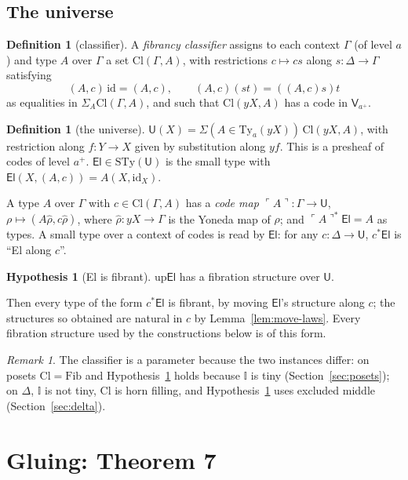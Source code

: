 \documentclass[11pt]{article}
\newcommand{\I}{\mathbb{I}}
\newcommand{\V}{\mathsf{V}}
\newcommand{\U}{\mathsf{U}}
\newcommand{\El}{\mathsf{El}}
\newcommand{\Fib}{\mathrm{Fib}}
\newcommand{\Ty}{\mathrm{Ty}}
\newcommand{\STy}{\mathrm{STy}}
\newcommand{\Cl}{\mathrm{Cl}}
\newcommand{\id}{\mathrm{id}}
\newcommand{\up}{\mathrm{up}}
\newcommand{\code}[1]{\ulcorner #1\urcorner}
\theoremstyle{plain}
\theoremstyle{definition}
\newtheorem{definition}[theorem]{Definition}
\newtheorem{hypothesis}[theorem]{Hypothesis}
\theoremstyle{remark}
\newtheorem{remark}[theorem]{Remark}
\begin{document}
\subsection{The universe}

\begin{definition}[classifier]
A \emph{fibrancy classifier} assigns to each context $\Gamma$ (of level
$a$) and type $A$ over $\Gamma$ a set $\Cl(\Gamma,A)$, with restrictions
$c\mapsto cs$ along $s:\Delta\to\Gamma$ satisfying
\[
(A,c)\,\id=(A,c),\qquad (A,c)(st)=((A,c)s)t
\]
as equalities in $\Sigma_A\Cl(\Gamma,A)$, and such that $\Cl(yX,A)$ has a
code in $\V_{a^+}$.
\end{definition}

\begin{definition}[the universe]
$\U(X)=\Sigma(A\in\Ty_a(yX))\,\Cl(yX,A)$, with restriction along
$f:Y\to X$ given by substitution along $yf$. This is a presheaf of codes
of level $a^+$. $\El\in\STy(\U)$ is the small type with
$\El(X,(A,c))=A(X,\id_X)$.
\end{definition}

A type $A$ over $\Gamma$ with $c\in\Cl(\Gamma,A)$ has a \emph{code map}
$\code{A}:\Gamma\to\U$, $\rho\mapsto(A\hat\rho,c\hat\rho)$, where
$\hat\rho:yX\to\Gamma$ is the Yoneda map of $\rho$; and
$\code{A}^*\El=A$ as types. A small type over a context of codes is read
by $\El$: for any $c:\Delta\to\U$, $c^*\El$ is ``El along $c$''.

\begin{hypothesis}[El is fibrant]\label{hyp:el}
$\up\El$ has a fibration structure over $\U$.
\end{hypothesis}

Then every type of the form $c^*\El$ is fibrant, by moving $\El$'s
structure along $c$; the structures so obtained are natural in $c$ by
Lemma~\ref{lem:move-laws}. Every fibration structure used by the
constructions below is of this form.

\begin{remark}
The classifier is a parameter because the two instances differ:
on posets $\Cl=\Fib$ and Hypothesis~\ref{hyp:el} holds because $\I$ is
tiny (Section~\ref{sec:posets}); on $\Delta$, $\I$ is not tiny, $\Cl$ is
horn filling, and Hypothesis~\ref{hyp:el} uses excluded middle
(Section~\ref{sec:delta}).
\end{remark}

\section{Gluing: Theorem 7}\label{sec:glue}
\end{document}
